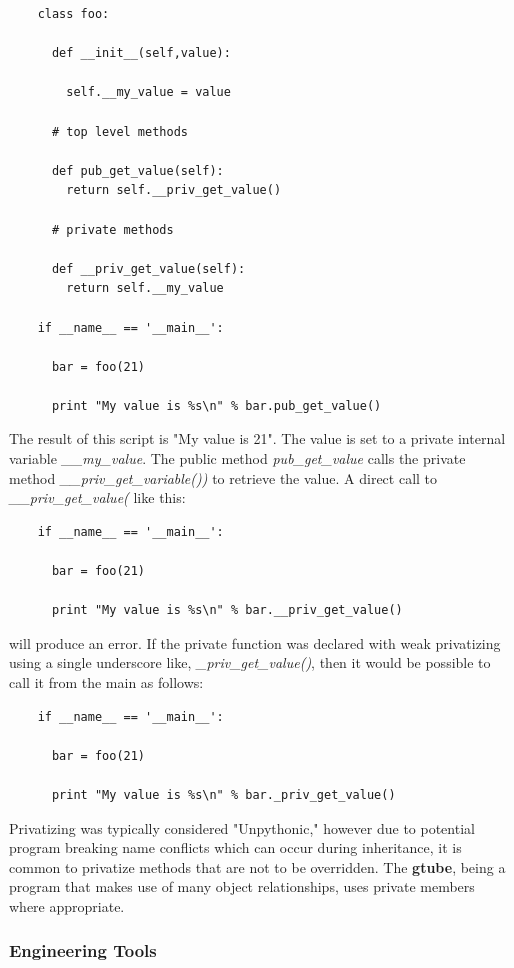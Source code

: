 \documentclass[12pt]{article}
\begin{document}
\begin{verbatim}
	class foo:

	  def __init__(self,value):

	    self.__my_value = value

	  # top level methods

	  def pub_get_value(self):
	    return self.__priv_get_value()

	  # private methods

	  def __priv_get_value(self):
	    return self.__my_value

	if __name__ == '__main__':

	  bar = foo(21)

	  print "My value is %s\n" % bar.pub_get_value()
\end{verbatim}

The result of this script is "My value is 21". The value is set to a private internal variable {\it \_\_my\_value}. The public method {\it pub\_get\_value} calls the private method {\it \_\_priv\_get\_variable())} to retrieve the value. A direct call to {\it \_\_priv\_get\_value(} like this:

\begin{verbatim}
	if __name__ == '__main__':

	  bar = foo(21)

	  print "My value is %s\n" % bar.__priv_get_value()
\end{verbatim}

 will produce an error. If the private function was declared with weak privatizing using a single underscore like,  {\it \_priv\_get\_value()}, then it would be possible to call it from the main as follows:

\begin{verbatim}
	if __name__ == '__main__':

	  bar = foo(21)

	  print "My value is %s\n" % bar._priv_get_value()
\end{verbatim}

Privatizing was typically considered "Unpythonic," however due to potential program breaking name conflicts which can occur during inheritance, it is common to privatize methods that are not to be overridden. The {\bf gtube}, being a program that makes use of many object relationships, uses private members where appropriate.


\subsubsection*{Engineering Tools}
\end{document}

